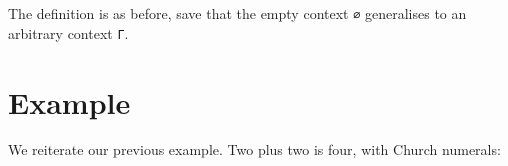 The definition is as before, save that the empty context \texttt{∅}
generalises to an arbitrary context \texttt{Γ}.

\hypertarget{example}{%
\section{Example}\label{example}}

We reiterate our previous example. Two plus two is four, with Church
numerals:

\begin{fence}
\begin{code}%
\>[0]\AgdaFunction{\AgdaUnderscore{}}%
\>[1129I]\AgdaSymbol{:}\AgdaSpace{}%
\AgdaSpace{}%
\AgdaSymbol{(}\AgdaSpace{}%
\AgdaSymbol{)}\AgdaSpace{}%
\AgdaSpace{}%
\<%
\\
\>[.][@{}l@{}]\<[1129I]%
\>[2]\<%
\\
\>[2][@{}l@{\AgdaIndent{0}}]%
\>[3]\AgdaSymbol{((}\<%
\\
\>[3][@{}l@{\AgdaIndent{0}}]%
\>[5]\AgdaSymbol{(}\<%
\\
\>[5][@{}l@{\AgdaIndent{0}}]%
\>[6]\AgdaSymbol{(}\<%
\\
\>[6][@{}l@{\AgdaIndent{0}}]%
\>[7]\AgdaSymbol{(}\<%
\\
\>[7][@{}l@{\AgdaIndent{0}}]%
\>[8]\AgdaSymbol{(}\AgdaSpace{}%
\AgdaSymbol{(}\AgdaSpace{}%
\AgdaSymbol{(}\AgdaSpace{}%
\AgdaSymbol{(}\AgdaSpace{}%
\AgdaSymbol{))))}\AgdaSpace{}%
\AgdaSpace{}%
\AgdaSymbol{(}\AgdaSpace{}%
\AgdaSymbol{(}\AgdaSpace{}%
\AgdaSymbol{))}\AgdaSpace{}%
\<%
\\
%
\>[8]\AgdaSymbol{((}\AgdaSpace{}%
\AgdaSymbol{(}\AgdaSpace{}%
\AgdaSymbol{(}\AgdaSpace{}%
\AgdaSymbol{)))}\AgdaSpace{}%

\end{code}
\end{fence}
